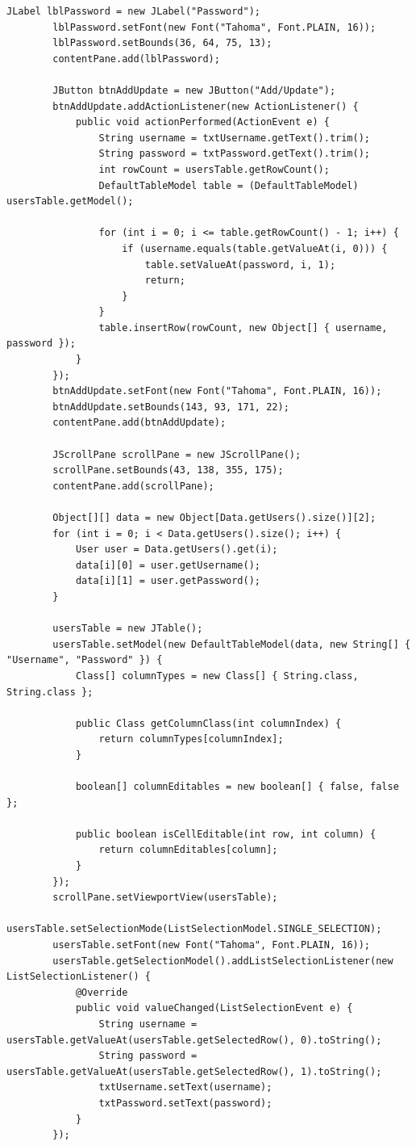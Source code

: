 \begin{lstlisting}[style=JavaStyle]
		JLabel lblPassword = new JLabel("Password");
		lblPassword.setFont(new Font("Tahoma", Font.PLAIN, 16));
		lblPassword.setBounds(36, 64, 75, 13);
		contentPane.add(lblPassword);
		
		JButton btnAddUpdate = new JButton("Add/Update");
		btnAddUpdate.addActionListener(new ActionListener() {
			public void actionPerformed(ActionEvent e) {
				String username = txtUsername.getText().trim();
				String password = txtPassword.getText().trim();
				int rowCount = usersTable.getRowCount();
				DefaultTableModel table = (DefaultTableModel) usersTable.getModel();
				
				for (int i = 0; i <= table.getRowCount() - 1; i++) {
					if (username.equals(table.getValueAt(i, 0))) {
						table.setValueAt(password, i, 1);
						return;
					}
				}
				table.insertRow(rowCount, new Object[] { username, password });
			}
		});
		btnAddUpdate.setFont(new Font("Tahoma", Font.PLAIN, 16));
		btnAddUpdate.setBounds(143, 93, 171, 22);
		contentPane.add(btnAddUpdate);
		
		JScrollPane scrollPane = new JScrollPane();
		scrollPane.setBounds(43, 138, 355, 175);
		contentPane.add(scrollPane);
		
		Object[][] data = new Object[Data.getUsers().size()][2];
		for (int i = 0; i < Data.getUsers().size(); i++) {
			User user = Data.getUsers().get(i);
			data[i][0] = user.getUsername();
			data[i][1] = user.getPassword();
		}
		
		usersTable = new JTable();
		usersTable.setModel(new DefaultTableModel(data, new String[] { "Username", "Password" }) {
			Class[] columnTypes = new Class[] { String.class, String.class };
			
			public Class getColumnClass(int columnIndex) {
				return columnTypes[columnIndex];
			}
			
			boolean[] columnEditables = new boolean[] { false, false };
			
			public boolean isCellEditable(int row, int column) {
				return columnEditables[column];
			}
		});
		scrollPane.setViewportView(usersTable);
		usersTable.setSelectionMode(ListSelectionModel.SINGLE_SELECTION);
		usersTable.setFont(new Font("Tahoma", Font.PLAIN, 16));
		usersTable.getSelectionModel().addListSelectionListener(new ListSelectionListener() {
			@Override
			public void valueChanged(ListSelectionEvent e) {
				String username = usersTable.getValueAt(usersTable.getSelectedRow(), 0).toString();
				String password = usersTable.getValueAt(usersTable.getSelectedRow(), 1).toString();
				txtUsername.setText(username);
				txtPassword.setText(password);
			}
		});
		

\end{lstlisting}

